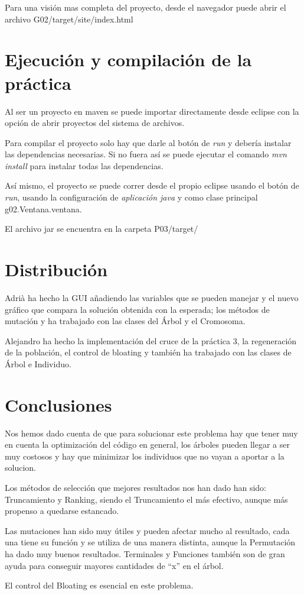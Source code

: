 \documentclass[twoside]{AiTeX}
\begin{document}
Para una visión mas completa del proyecto, desde el navegador puede abrir el archivo G02/target/site/index.html

\section{Ejecución y compilación de la práctica}

Al ser un proyecto en maven se puede importar directamente desde eclipse con la opción de abrir proyectos del sistema de archivos.

Para compilar el proyecto solo hay que darle al botón de \textit{run} y debería instalar las dependencias necesarias. Si no fuera así se puede ejecutar el comando \textit{mvn install} para instalar todas las dependencias.

Así mismo, el proyecto se puede correr desde el propio eclipse usando el botón de \textit{run}, usando la configuración de \textit{aplicación java} y como clase principal g02.Ventana.ventana.

El archivo jar se encuentra en la carpeta P03/target/



\section{Distribución}

Adrià ha hecho la GUI añadiendo las variables que se pueden manejar y el nuevo gráfico que compara la solución obtenida con la esperada; los métodos de mutación y ha trabajado con las clases del Árbol y el Cromosoma.

Alejandro ha hecho la implementación del cruce de la práctica 3, la regeneración de la población, el control de bloating y también ha trabajado con las clases de Árbol e Individuo.

\section{Conclusiones}

Nos hemos dado cuenta de que para solucionar este problema hay que tener muy en cuenta la optimización del código en general, los árboles pueden llegar a ser muy costosos y hay que minimizar los individuos que no vayan a aportar a la solucion.

Los métodos de selección que mejores resultados nos han dado han sido: Truncamiento y Ranking, siendo el Truncamiento el más efectivo, aunque más propenso a quedarse estancado.

Las mutaciones han sido muy útiles y pueden afectar mucho al resultado, cada una tiene su función y se utiliza de una manera distinta, aunque la Permutación ha dado muy buenos resultados. Terminales y Funciones también son de gran ayuda para conseguir mayores cantidades de ``x'' en el árbol.

El control del Bloating es esencial en este problema.
\end{document}
